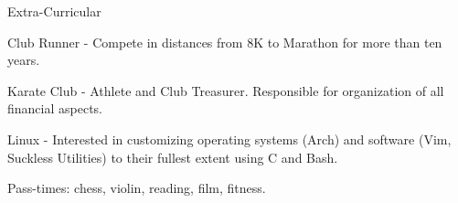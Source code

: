 \documentclass{resume} %
\begin{document}
\begin{rSection}{Extra-Curricular} \itemsep -3pt
	\item Club Runner - Compete in distances from 8K to Marathon for more than ten years.
	\item Karate Club - Athlete and Club Treasurer. Responsible for organization of all financial aspects.
	\item Linux - Interested in customizing operating systems (Arch) and software (Vim, Suckless Utilities) to their fullest extent using C and Bash.
	\item Pass-times: chess, violin, reading, film, fitness.
\end{rSection}
\end{document}
